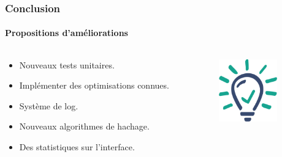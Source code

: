 \documentclass{beamer}
\begin{document}
\begin{frame}
\frametitle{Conclusion}
\framesubtitle{Propositions d’améliorations}
\begin{columns}
\begin{column}{0.6\textwidth}
\begin{itemize}
    \item Nouveaux tests unitaires.
    \item Implémenter des optimisations connues.
    \item Système de log.
    \item Nouveaux algorithmes de hachage.
    \item Des statistiques sur l'interface.
\end{itemize}
\end{column}
\begin{column}{0.4\textwidth}
\begin{figure}[H]
\centering
\includegraphics[height=2.7cm]{img/ampoule.png}
\end{figure}
\end{column}
\end{columns}
\end{frame}
\end{document}
